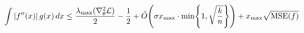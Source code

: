 \documentclass[preview]{standalone}
\begin{document}
\begin{align*}
\special{dvisvgm:raw <g id='unique000'>}\int|f''(x)|\,g(x)\,dx\le\frac{\lambda_{\max}(\nabla^2_\theta\mathcal{L})}{2}-\frac{1}{2}+\tilde{O}\!\left(\sigma x_{\max}\cdot\min\!\left\{1,\sqrt{\frac{k}{n}}\right\}\right)+x_{\max}\sqrt{\mathrm{MSE}(f)}\special{dvisvgm:raw </g>}
\end{align*}
\end{document}
